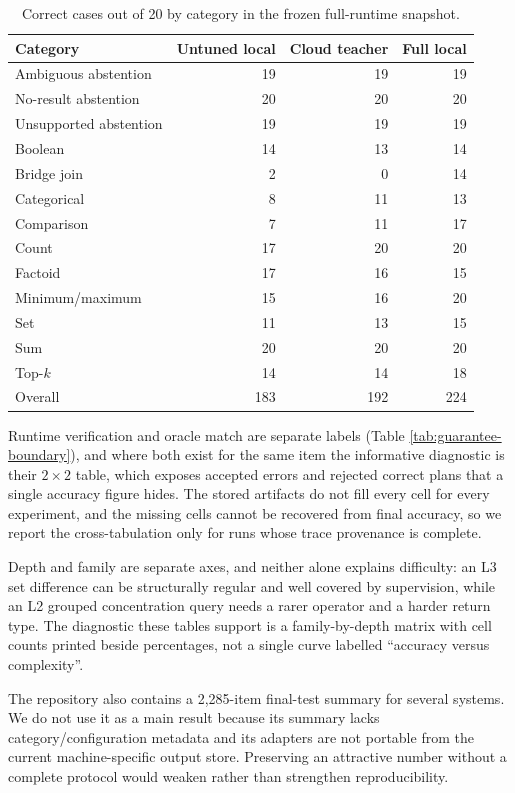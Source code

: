 \begin{table}[h]
  \caption{Correct cases out of 20 by category in the frozen full-runtime snapshot.}
  \centering
  \scriptsize
  \begin{tabular}{lrrr}
    \toprule
    Category & Untuned local & Cloud teacher & Full local \\
    \midrule
    Ambiguous abstention & 19 & 19 & 19 \\
    No-result abstention & 20 & 20 & 20 \\
    Unsupported abstention & 19 & 19 & 19 \\
    Boolean & 14 & 13 & 14 \\
    Bridge join & 2 & 0 & 14 \\
    Categorical & 8 & 11 & 13 \\
    Comparison & 7 & 11 & 17 \\
    Count & 17 & 20 & 20 \\
    Factoid & 17 & 16 & 15 \\
    Minimum/maximum & 15 & 16 & 20 \\
    Set & 11 & 13 & 15 \\
    Sum & 20 & 20 & 20 \\
    Top-$k$ & 14 & 14 & 18 \\
    \midrule
    Overall & 183 & 192 & 224 \\
    \bottomrule
  \end{tabular}
\end{table}

Runtime verification and oracle match are separate labels (Table \ref{tab:guarantee-boundary}),
and where both exist for the same item the informative diagnostic is their $2\times2$ table,
which exposes accepted errors and rejected correct plans that a single accuracy figure hides.
The stored artifacts do not fill every cell for every experiment, and the missing cells cannot be
recovered from final accuracy, so we report the cross-tabulation only for runs whose trace
provenance is complete.

Depth and family are separate axes, and neither alone explains difficulty: an L3 set difference
can be structurally regular and well covered by supervision, while an L2 grouped concentration
query needs a rarer operator and a harder return type.  The diagnostic these tables support is a
family-by-depth matrix with cell counts printed beside percentages, not a single curve labelled
``accuracy versus complexity''.

The repository also contains a 2,285-item final-test summary for several systems.  We do not use
it as a main result because its summary lacks category/configuration metadata and its adapters
are not portable from the current machine-specific output store.  Preserving an attractive
number without a complete protocol would weaken rather than strengthen reproducibility.
